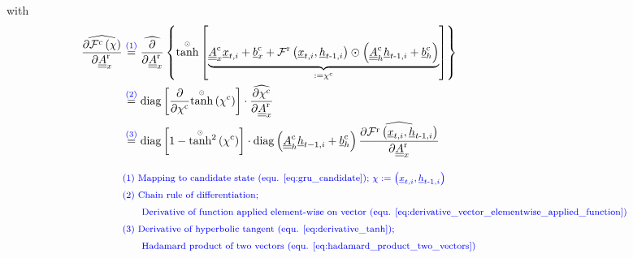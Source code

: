 with
\begin{align} \label{eq:gru_grad_intra_candidate_2_Arx}
    \widehat{
        \frac{\partial \mathcal{F}^\text{c} \left(\chi\right)}
            {\partial \underline{\underline{A}}^\text{r}_x}
    }
    & \overset{\textcolor{blue}{(1)}}{=}
    \widehat{
        \frac{\partial}{\partial \underline{\underline{A}}^\text{r}_x} 
    }
    \left\{
        \overset{\scriptscriptstyle \odot}{\tanh} \left[
            \underbrace{
            \underline{\underline A}^\text{c}_{x}
            \underline x_{t,i}
            +
            \underline b^\text{c}_{x}
            +
            \mathcal{F}^\text{r}\left(\underline x_{t, i}, \underline h_{t\text -1, i}\right)
            \odot
            \left(
                \underline{\underline A}^\text{c}_{h}
                \underline h_{t\text -1,i}
                +
                \underline b^\text{c}_{h}
            \right)}_{:=\chi^\text{c}}
        \right]
    \right\}
    \nonumber \\ & \overset{\textcolor{blue}{(2)}}{=}
    \mathrm{diag} \left[
        \frac{\partial}{\partial \chi^\text{c}}
        \overset{\scriptscriptstyle \odot}{\tanh} \left(\chi^\text{c}\right)
    \right] 
    \cdot 
    \widehat{
        \frac{\partial \chi^\text{c}}
            {\partial \underline{\underline{A}}^\text{r}_x} 
    }
    \nonumber \\ & \overset{\textcolor{blue}{(3)}}{=}
    \mathrm{diag} \left[
        1 - \overset{\scriptscriptstyle \odot}{\tanh}{}^2 \left(\chi^\text{c}\right)
    \right] 
    \cdot
    \mathrm{diag} \left(
        \underline{\underline A}^\text{c}_{h}
        \underline h_{t-1,i}
        +
        \underline b^\text{c}_{h}
    \right)
    \widehat{
        \frac{\partial \mathcal{F}^\text{r}\left(\underline x_{t, i}, \underline h_{t\text -1, i}\right)}
            {\partial \underline{\underline{A}}^\text{r}_x} 
    }
    \\[2ex]
    &\textcolor{blue}{\text{\footnotesize (1) 
            Mapping to candidate state (equ. \ref{eq:gru_candidate}); 
            $\chi :=  \left(\underline x_{t, i}, \underline h_{t\text{-}1, i}\right)$}} \nonumber \\
    &\textcolor{blue}{\text{\footnotesize (2) 
        Chain rule of differentiation;  
    }} \nonumber \\
    &\textcolor{blue}{\text{\footnotesize \qquad
        Derivative of function applied element-wise on vector
        (equ. \ref{eq:derivative_vector_elementwise_applied_function})
    }} \nonumber \\
    &\textcolor{blue}{\text{\footnotesize (3) 
        Derivative of hyperbolic tangent (equ. \ref{eq:derivative_tanh}); 
    }} \nonumber \\
    &\textcolor{blue}{\text{\footnotesize \qquad
    Hadamard product of two vectors (equ. \ref{eq:hadamard_product_two_vectors})
    }} \nonumber
\end{align}
